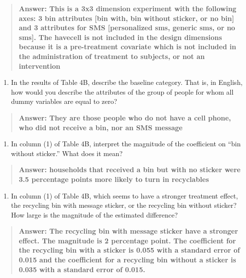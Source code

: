\documentclass[
]{article}
\providecommand{\tightlist}{%
  \setlength{\itemsep}{0pt}\setlength{\parskip}{0pt}}
\begin{document}
\begin{quote}
\textbf{Answer: This is a 3x3 dimension experiment with the following
axes: 3 bin attributes {[}bin with, bin without sticker, or no bin{]}
and 3 attributes for SMS {[}personalized sms, generic sms, or no sms{]}.
The havecell is not included in the design dimensions because it is a
pre-treatment covariate which is not included in the administration of
treatment to subjects, or not an intervention}
\end{quote}

\begin{enumerate}
\def\labelenumi{\arabic{enumi}.}
\setcounter{enumi}{1}
\tightlist
\item
  In the results of Table 4B, describe the baseline category. That is,
  in English, how would you describe the attributes of the group of
  people for whom all dummy variables are equal to zero?
\end{enumerate}

\begin{quote}
\textbf{Answer: They are those people who do not have a cell phone, who
did not receive a bin, nor an SMS message}
\end{quote}

\begin{enumerate}
\def\labelenumi{\arabic{enumi}.}
\setcounter{enumi}{2}
\tightlist
\item
  In column (1) of Table 4B, interpret the magnitude of the coefficient
  on ``bin without sticker.'' What does it mean?
\end{enumerate}

\begin{quote}
\textbf{Answer: households that received a bin but with no sticker were
3.5 percentage points more likely to turn in recyclables}
\end{quote}

\begin{enumerate}
\def\labelenumi{\arabic{enumi}.}
\setcounter{enumi}{3}
\tightlist
\item
  In column (1) of Table 4B, which seems to have a stronger treatment
  effect, the recycling bin with message sticker, or the recycling bin
  without sticker? How large is the magnitude of the estimated
  difference?
\end{enumerate}

\begin{quote}
\textbf{Answer: The recycling bin with message sticker have a stronger
effect. The magnitude is 2 percentage point. The coefficient for the
recycling bin with a sticker is 0.055 with a standard error of 0.015 and
the coefficient for a recycling bin without a sticker is 0.035 with a
standard error of 0.015.}
\end{quote}
\end{document}
